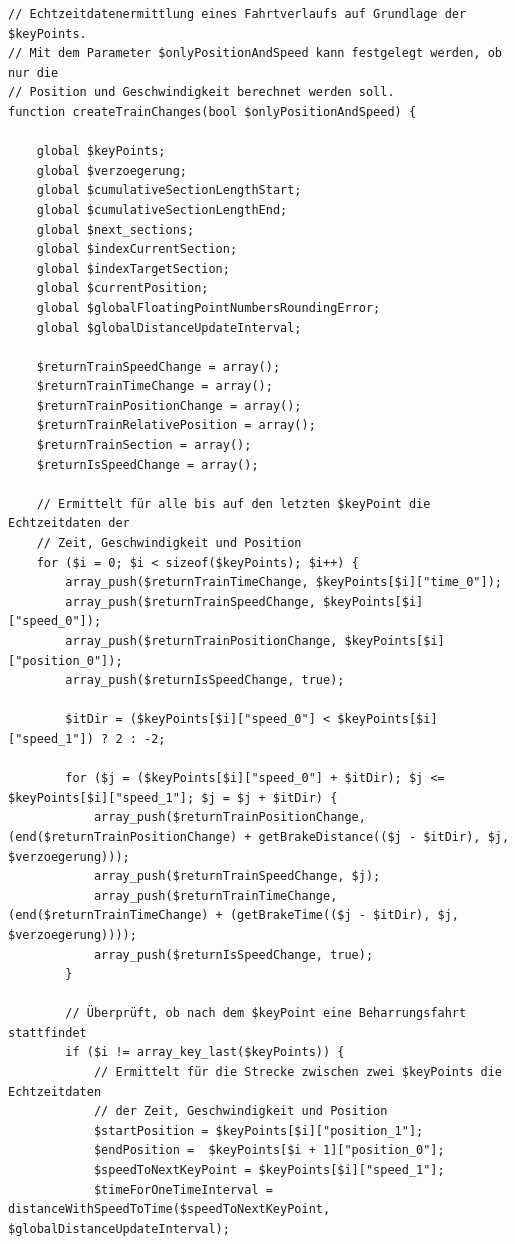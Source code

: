 \begin{lstlisting}[caption={\textit{createTrainChanges$($$)$} (\textit{functions\_fahrtverlauf.php})},captionpos=b,label={lst:createTrainChanges}]
// Echtzeitdatenermittlung eines Fahrtverlaufs auf Grundlage der $keyPoints.
// Mit dem Parameter $onlyPositionAndSpeed kann festgelegt werden, ob nur die
// Position und Geschwindigkeit berechnet werden soll.
function createTrainChanges(bool $onlyPositionAndSpeed) {

	global $keyPoints;
	global $verzoegerung;
	global $cumulativeSectionLengthStart;
	global $cumulativeSectionLengthEnd;
	global $next_sections;
	global $indexCurrentSection;
	global $indexTargetSection;
	global $currentPosition;
	global $globalFloatingPointNumbersRoundingError;
	global $globalDistanceUpdateInterval;

	$returnTrainSpeedChange = array();
	$returnTrainTimeChange = array();
	$returnTrainPositionChange = array();
	$returnTrainRelativePosition = array();
	$returnTrainSection = array();
	$returnIsSpeedChange = array();

	// Ermittelt für alle bis auf den letzten $keyPoint die Echtzeitdaten der
	// Zeit, Geschwindigkeit und Position
	for ($i = 0; $i < sizeof($keyPoints); $i++) {
		array_push($returnTrainTimeChange, $keyPoints[$i]["time_0"]);
		array_push($returnTrainSpeedChange, $keyPoints[$i]["speed_0"]);
		array_push($returnTrainPositionChange, $keyPoints[$i]["position_0"]);
		array_push($returnIsSpeedChange, true);

		$itDir = ($keyPoints[$i]["speed_0"] < $keyPoints[$i]["speed_1"]) ? 2 : -2;

		for ($j = ($keyPoints[$i]["speed_0"] + $itDir); $j <= $keyPoints[$i]["speed_1"]; $j = $j + $itDir) {
			array_push($returnTrainPositionChange, (end($returnTrainPositionChange) + getBrakeDistance(($j - $itDir), $j, $verzoegerung)));
			array_push($returnTrainSpeedChange, $j);
			array_push($returnTrainTimeChange, (end($returnTrainTimeChange) + (getBrakeTime(($j - $itDir), $j, $verzoegerung))));
			array_push($returnIsSpeedChange, true);
		}
		
		// Überprüft, ob nach dem $keyPoint eine Beharrungsfahrt stattfindet
		if ($i != array_key_last($keyPoints)) {
			// Ermittelt für die Strecke zwischen zwei $keyPoints die Echtzeitdaten
			// der Zeit, Geschwindigkeit und Position
			$startPosition = $keyPoints[$i]["position_1"];
			$endPosition =  $keyPoints[$i + 1]["position_0"];
			$speedToNextKeyPoint = $keyPoints[$i]["speed_1"];
			$timeForOneTimeInterval = distanceWithSpeedToTime($speedToNextKeyPoint, $globalDistanceUpdateInterval);


\end{lstlisting}
